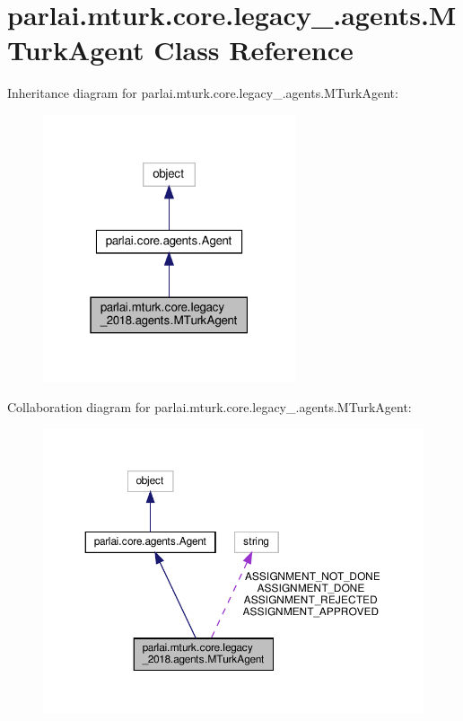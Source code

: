 \hypertarget{classparlai_1_1mturk_1_1core_1_1legacy__2018_1_1agents_1_1MTurkAgent}{}\section{parlai.\+mturk.\+core.\+legacy\+\_.\+agents.\+M\+Turk\+Agent Class Reference}
\label{classparlai_1_1mturk_1_1core_1_1legacy__2018_1_1agents_1_1MTurkAgent}


Inheritance diagram for parlai.\+mturk.\+core.\+legacy\+\_.\+agents.\+M\+Turk\+Agent\+:
\nopagebreak
\begin{figure}[H]
\begin{center}
\leavevmode
\includegraphics[width=211pt]{classparlai_1_1mturk_1_1core_1_1legacy__2018_1_1agents_1_1MTurkAgent__inherit__graph}
\end{center}
\end{figure}


Collaboration diagram for parlai.\+mturk.\+core.\+legacy\+\_.\+agents.\+M\+Turk\+Agent\+:
\nopagebreak
\begin{figure}[H]
\begin{center}
\leavevmode
\includegraphics[width=350pt]{classparlai_1_1mturk_1_1core_1_1legacy__2018_1_1agents_1_1MTurkAgent__coll__graph}
\end{center}
\end{figure}
